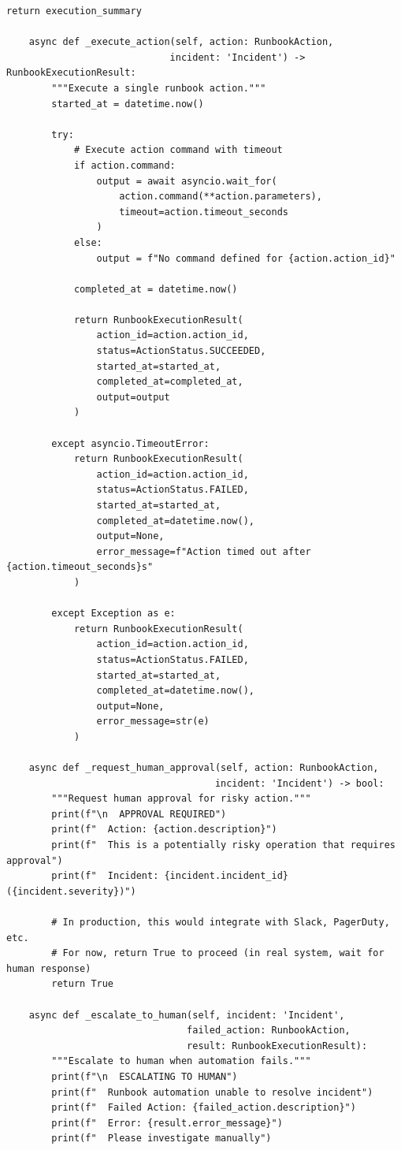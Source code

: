 \begin{lstlisting}[style=python, caption={Runbook automation with guided remediation}]
        return execution_summary

    async def _execute_action(self, action: RunbookAction,
                             incident: 'Incident') -> RunbookExecutionResult:
        """Execute a single runbook action."""
        started_at = datetime.now()

        try:
            # Execute action command with timeout
            if action.command:
                output = await asyncio.wait_for(
                    action.command(**action.parameters),
                    timeout=action.timeout_seconds
                )
            else:
                output = f"No command defined for {action.action_id}"

            completed_at = datetime.now()

            return RunbookExecutionResult(
                action_id=action.action_id,
                status=ActionStatus.SUCCEEDED,
                started_at=started_at,
                completed_at=completed_at,
                output=output
            )

        except asyncio.TimeoutError:
            return RunbookExecutionResult(
                action_id=action.action_id,
                status=ActionStatus.FAILED,
                started_at=started_at,
                completed_at=datetime.now(),
                output=None,
                error_message=f"Action timed out after {action.timeout_seconds}s"
            )

        except Exception as e:
            return RunbookExecutionResult(
                action_id=action.action_id,
                status=ActionStatus.FAILED,
                started_at=started_at,
                completed_at=datetime.now(),
                output=None,
                error_message=str(e)
            )

    async def _request_human_approval(self, action: RunbookAction,
                                     incident: 'Incident') -> bool:
        """Request human approval for risky action."""
        print(f"\n  APPROVAL REQUIRED")
        print(f"  Action: {action.description}")
        print(f"  This is a potentially risky operation that requires approval")
        print(f"  Incident: {incident.incident_id} ({incident.severity})")

        # In production, this would integrate with Slack, PagerDuty, etc.
        # For now, return True to proceed (in real system, wait for human response)
        return True

    async def _escalate_to_human(self, incident: 'Incident',
                                failed_action: RunbookAction,
                                result: RunbookExecutionResult):
        """Escalate to human when automation fails."""
        print(f"\n  ESCALATING TO HUMAN")
        print(f"  Runbook automation unable to resolve incident")
        print(f"  Failed Action: {failed_action.description}")
        print(f"  Error: {result.error_message}")
        print(f"  Please investigate manually")


\end{lstlisting}
